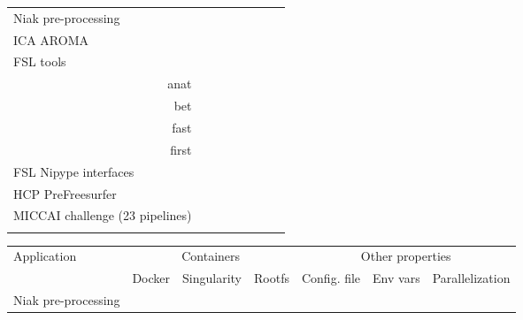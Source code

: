 \documentclass{article}
\begin{document}
\begin{table}
\begin{tabular}{l|ccccccc}
    \hline
    Niak pre-processing              &                   &\cellcolor{gray!75}&\cellcolor{gray!75}&\cellcolor{gray!75}&\cellcolor{gray!75}&\\
    ICA AROMA                        &\cellcolor{gray!75}&\cellcolor{gray!75}&                   &\cellcolor{gray!75}&\cellcolor{gray!75}&\cellcolor{gray!75}&\cellcolor{gray!75}\\
    FSL tools &&&&&&\\
    \multicolumn{1}{r|}{anat}        &\cellcolor{gray!75}&\cellcolor{gray!75}&                   &\cellcolor{gray!75}&\cellcolor{gray!75}&\cellcolor{gray!75}&\cellcolor{gray!75}\\
    \multicolumn{1}{r|}{bet}         &\cellcolor{gray!75}&\cellcolor{gray!75}&\cellcolor{gray!75}&\cellcolor{gray!75}&                   &                   &\cellcolor{gray!75}\\      
    \multicolumn{1}{r|}{fast}        &\cellcolor{gray!75}&                   &                   &\cellcolor{gray!75}&\cellcolor{gray!75}&\cellcolor{gray!75}&\cellcolor{gray!75}\\
    \multicolumn{1}{r|}{first}       &                   &                   &\cellcolor{gray!75}&\cellcolor{gray!75}&\cellcolor{gray!75}&                   &                   \\
    FSL Nipype interfaces     \\
    HCP PreFreesurfer                &                   &                   &                   &                   &                   &                   &                   \\
    MICCAI challenge (23 pipelines)\\&                   &                   &                   &                   &                   &                   & \\
    \end{tabular}
  \vspace*{0.5cm}
  \begin{tabular}{l|ccc|ccc}
    \hline
    \rowcolor[gray]{0.9}
    Application                     &\multicolumn{3}{c|}{Containers}            &  \multicolumn{3}{c}{Other properties}  \\
    \rowcolor[gray]{0.9}
                                    &Docker              & Singularity& Rootfs  & Config. file & Env vars  & Parallelization   \\
    \hline
    Niak pre-processing             &\cellcolor{gray!75} &            &         &              &\cellcolor{gray!75}&\cellcolor{gray!75}\\

\end{tabular}
\end{table}
\end{document}
